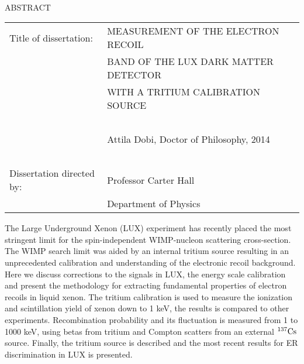 
\hbox{\ }

\renewcommand{\baselinestretch}{1}
\small \normalsize

\begin{center}
\large{{ABSTRACT}} 

\vspace{3em} 

\end{center}
\hspace{-.15in}
\begin{tabular}{ll}
Title of dissertation:    & {\large  MEASUREMENT OF THE ELECTRON RECOIL}\\
&				      {\large  BAND OF THE LUX DARK MATTER DETECTOR} \\
&				      {\large  WITH A TRITIUM CALIBRATION SOURCE} \\

\ \\
&                          {\large  Attila Dobi, Doctor of Philosophy, 2014} \\
\ \\
Dissertation directed by: & {\large  Professor Carter Hall} \\
&  				{\large	 Department of Physics } \\
\end{tabular}

\vspace{3em}

\renewcommand{\baselinestretch}{2}
\large \normalsize

The Large Underground Xenon (LUX) experiment has recently placed the most stringent limit for the spin-independent WIMP-nucleon scattering cross-section. The WIMP search limit was aided by an internal tritium source resulting in an unprecedented calibration and understanding of the electronic recoil background. Here we discuss corrections to the signals in LUX, the energy scale calibration and present the methodology for extracting fundamental properties of electron recoils in liquid xenon. The tritium calibration is used to measure the ionization and scintillation yield of xenon down to 1 keV, the results is compared to other experiments. Recombination probability and its fluctuation is measured from 1 to 1000 keV, using betas from tritium and Compton scatters from an external $\rm ^{137}Cs$ source. Finally, the tritium source is described and the most recent results for ER discrimination in LUX is presented.
